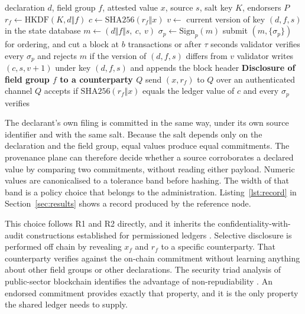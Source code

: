 \documentclass[information,article,submit,moreauthors]{Definitions/mdpi}
\begin{document}
\begin{algorithm}[H]
\caption{Attestation write and selective disclosure.\label{alg:attest}}
\small
\begin{algorithmic}[1]
\Require declaration $d$, field group $f$, attested value $x$, source $s$, salt key $K$, endorsers $P$
\State $r_f \gets \mathrm{HKDF}(K, d \Vert f)$ 
\State $c \gets \mathrm{SHA256}(r_f \Vert x)$ 
\State $v \gets$ current version of key $(d, f, s)$ in the state database
\State $m \gets (d \Vert f \Vert s,\ c,\ v)$
  \State $\sigma_p \gets \mathrm{Sign}_p(m)$ 
\EndFor
\State submit $(m, \{\sigma_p\})$ for ordering, and cut a block at $b$ transactions or after $\tau$ seconds
\State validator verifies every $\sigma_p$ and rejects $m$ if the version of $(d, f, s)$ differs from $v$
\State validator writes $(c, s, v+1)$ under key $(d, f, s)$ and appends the block header
\Statex \textbf{Disclosure of field group $f$ to a counterparty $Q$}
\State send $(x, r_f)$ to $Q$ over an authenticated channel
\State $Q$ accepts if $\mathrm{SHA256}(r_f \Vert x)$ equals the ledger value of $c$ and every $\sigma_p$ verifies
\end{algorithmic}
\end{algorithm}

The declarant's own filing is committed in the same way, under its own source identifier and with the same salt. Because the salt depends only on the declaration and the field group, equal values produce equal commitments. The provenance plane can therefore decide whether a source corroborates a declared value by comparing two commitments, without reading either payload. Numeric values are canonicalised to a tolerance band before hashing. The width of that band is a policy choice that belongs to the administration. Listing~\ref{lst:record} in Section~\ref{sec:results} shows a record produced by the reference node.

This choice follows R1 and R2 directly, and it inherits the confidentiality-with-audit constructions established for permissioned ledgers \cite{kang2019fabzk,androulaki2020auditable}. Selective disclosure is performed off chain by revealing $x_f$ and $r_f$ to a specific counterparty. That counterparty verifies against the on-chain commitment without learning anything about other field groups or other declarations. The security triad analysis of public-sector blockchain identifies the advantage of non-repudiability \cite{warkentin2020triad}. An endorsed commitment provides exactly that property, and it is the only property the shared ledger needs to supply.
\end{document}
